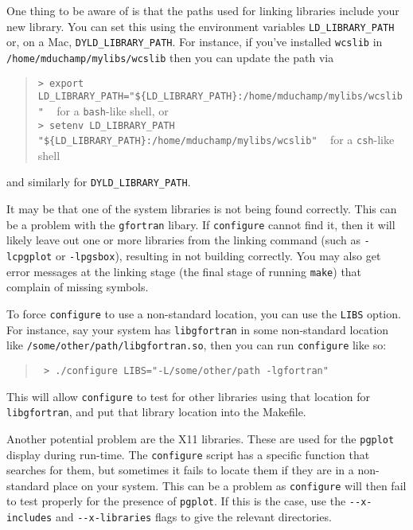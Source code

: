 One thing to be aware of is that the paths used for linking libraries
include your new library. You can set this using the environment
variables \verb|LD_LIBRARY_PATH| or, on a Mac,
\verb|DYLD_LIBRARY_PATH|. For instance, if you've installed
\texttt{wcslib} in \texttt{/home/mduchamp/mylibs/wcslib} then you can
update the path via

\begin{quote}
{\footnotesize
\verb|> export LD_LIBRARY_PATH="${LD_LIBRARY_PATH}:/home/mduchamp/mylibs/wcslib"|
\,\,\, for a \texttt{bash}-like shell, or\\
\verb|> setenv LD_LIBRARY_PATH "${LD_LIBRARY_PATH}:/home/mduchamp/mylibs/wcslib"|
\,\,\, for a \texttt{csh}-like shell
}
\end{quote}
and similarly for \verb|DYLD_LIBRARY_PATH|.


It may be that one of the system libraries is not being found
correctly. This can be a problem with the \texttt{gfortran} libary. If
\texttt{configure} cannot find it, then it will likely leave out one
or more libraries from the linking command (such as \verb|-lcpgplot|
or \verb|-lpgsbox|), resulting in \duchamp not building correctly. You
may also get error messages at the linking stage (the final stage of
running \texttt{make}) that complain of missing symbols.

To force \texttt{configure} to use a non-standard location, you can
use the \verb|LIBS| option. For instance, say your system has
\verb|libgfortran| in some non-standard location like
\verb|/some/other/path/libgfortran.so|, then you can run
\texttt{configure} like so:

\begin{quote}
{\footnotesize
\verb| > ./configure LIBS="-L/some/other/path -lgfortran"|
}
\end{quote}

This will allow \texttt{configure} to test for other libraries using
that location for \texttt{libgfortran}, and put that library location
into the Makefile.

Another potential problem are the X11 libraries. These are used for
the \texttt{pgplot} display during run-time. The \texttt{configure}
script has a specific function that searches for them, but sometimes
it fails to locate them if they are in a non-standard place on your
system. This can be a problem as \texttt{configure} will then fail to
test properly for the presence of \texttt{pgplot}.  If this is the
case, use the \verb|--x-includes| and \verb|--x-libraries| flags to
give the relevant directories.

